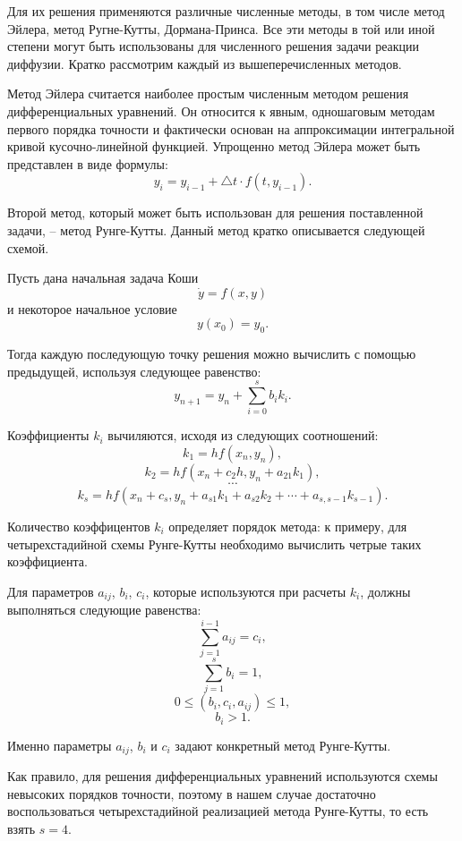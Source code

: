 \documentclass[a4paper, 14pt]{extarticle}
\theoremstyle{definition}
\begin{document}
\par Для их решения применяются различные численные методы, в том числе метод Эйлера, метод Ругне-Кутты, Дормана-Принса. Все эти методы в той или иной степени могут быть использованы для численного решения задачи реакции диффузии. Кратко рассмотрим каждый из вышеперечисленных методов.

\par Метод Эйлера считается наиболее простым численным методом решения дифференциальных уравнений. Он относится к явным, одношаговым методам первого порядка точности и фактически основан на аппроксимации интегральной кривой кусочно-линейной функцией. Упрощенно метод Эйлера может быть представлен в виде формулы:
$$y_i = y_{i-1} + \bigtriangleup t \cdot f(t, y_{i-1}).$$

\par Второй метод, который может быть использован для решения поставленной задачи, -- метод Рунге-Кутты. Данный метод кратко описывается следующей схемой.

\par Пусть дана начальная задача Коши
$$\dot y = f(x, y)$$
и некоторое начальное условие
$$y(x_0) = y_0.$$

\par Тогда каждую последующую точку решения можно вычислить с помощью предыдущей, используя следующее равенство:
$$y_{n+1} = y_n + \sum_{i=0}^s b_i k_i.$$

\par Коэффициенты $k_i$ вычиляются, исходя из следующих соотношений:
$$k_1 = hf(x_n, y_n),$$
$$k_2 = hf(x_n + c_2 h, y_n + a_{21}k_1),$$
$$\cdots$$
$$k_s = hf(x_n + c_s, y_n + a_{s1}k_1 + a_{s2}k_2 + \cdots + a_{s,s-1}k_{s-1}).$$

\par Количество коэффицентов $k_i$ определяет порядок метода: к примеру, для четырехстадийной схемы Рунге-Кутты необходимо вычислить четрые таких коэффициента.

\par Для параметров $a_{ij}$, $b_i$, $c_i$, которые используются при расчеты $k_i$, должны выполняться следующие равенства:
$$\sum_{j=1}^{i-1}{a_{ij}} = c_i,$$
$$\sum_{j=1}^s{b_i} = 1,$$
$$0 \le (b_i, c_i, a_{ij}) \le 1,$$
$$b_i > 1.$$

\par Именно параметры $a_{ij}$, $b_i$ и $c_i$ задают конкретный метод Рунге-Кутты.

\par Как правило, для решения дифференциальных уравнений используются схемы невысоких порядков точности, поэтому в нашем случае достаточно воспользоваться четырехстадийной реализацией метода Рунге-Кутты, то есть взять $s = 4$.
\end{document}
